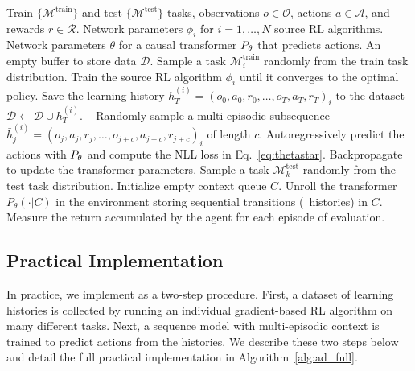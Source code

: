 \begin{algorithm}[h]
\caption{\texttt{Algorithm Distillation}} \label{alg:ad_full}
\begin{algorithmic}[1]
\footnotesize

\Require Train $\{ \mathcal M^{\text{train}} \}$ and test $\{ \mathcal M^{\text{test}} \}$ tasks, observations $o \in \mathcal O$, actions $a \in \mathcal A$, and rewards $r \in \mathcal R$.
\Require Network parameters $\phi_i$ for $i=1,\dots, N$ source RL algorithms. 
\Require Network parameters $\theta$ for a causal transformer $P_{\theta}$ that predicts actions.
\Require An empty buffer to store data $\mathcal D$.
 
\State Sample a task $\mathcal{M}^{\text{train}}_i$ randomly from the train task distribution.
\State Train the source RL algorithm $\phi_i$ until it converges to the optimal policy.
\State Save the learning history $h^{(i)}_{T} = \left( o_{0}, a_{0}, r_{0}, \ldots, o_{T}, a_{T}, r_{T} \right)_i$ to the dataset $\mathcal D \leftarrow \mathcal D \cup h^{(i)}_T $.
\EndFor
\
 
\State Randomly sample a multi-episodic subsequence $\bar h^{(i)}_j = \left( o_{j}, a_{j}, r_{j}, \ldots, o_{j+c}, a_{j+c}, r_{j+c} \right)_i$ of length $c$.
\State  Autoregressively predict the actions with $P_\theta$ and compute the NLL loss in Eq.~\ref{eq:thetastar}.
\State Backpropagate to update the transformer parameters.
\EndWhile
{}  
\State Sample a task $\mathcal{M}^{\text{test}}_k$ randomly from the test task distribution. Initialize empty context queue $C$.
\State Unroll the transformer $P_\theta (\cdot | C)$ in the environment  storing sequential transitions (\ie\, histories) in $C$.
\State Measure the return accumulated by the agent for each episode of evaluation.
\EndFor
\end{algorithmic}
\end{algorithm}

\subsection{Practical Implementation}
\label{subsec:practical-implementation}

In practice, we implement \name as a two-step procedure. First, a dataset of learning histories is collected by running an individual gradient-based RL algorithm on many different tasks. Next, a sequence model with multi-episodic context is trained to predict actions from the histories. We describe these two steps below and detail the full practical implementation in Algorithm~\ref{alg:ad_full}.

